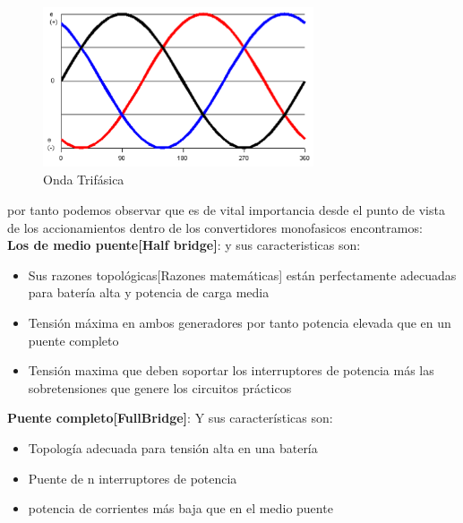 \documentclass[a3paper,12pt]{article}
\begin{document}
{\begin{flushleft}
{			
			\begin{figure}[hbtp]
			\centering
			\includegraphics[width=8cm]{Tensiones-trifasicas.png}
			\caption{Onda Trifásica}
			\end{figure}
por tanto podemos observar que es de vital importancia desde el punto de vista de los accionamientos \vspace{.5cm}
dentro de los convertidores monofasicos encontramos:\\ 
\textbf{Los de medio puente[Half bridge]}: y sus caracteristicas son:\\
	\begin{itemize}
	\item	Sus razones topológicas[Razones matemáticas] están perfectamente adecuadas para batería alta y potencia de carga media 
	\item	Tensión máxima en ambos generadores por tanto potencia elevada que en un puente completo 
	\item	Tensión maxima que deben soportar los interruptores de potencia más las sobretensiones que genere los circuitos prácticos 
	\end{itemize}

\textbf{Puente completo[FullBridge]}: Y sus características son:\\
\begin{itemize}
	\item Topología adecuada para tensión alta en una batería 
	\item Puente de n interruptores de potencia 
	\item potencia de corrientes más baja que en el medio puente
	
\end{itemize}
		
}
\end{flushleft}}
\end{document}
